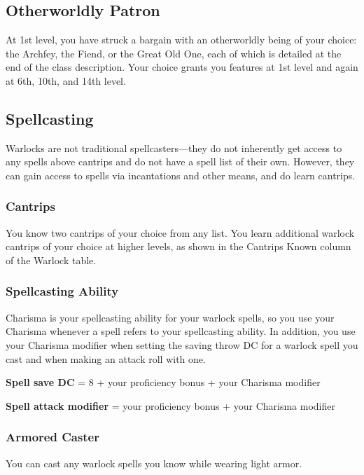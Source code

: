 \subsection{Otherworldly Patron}

At 1st level, you have struck a bargain with an otherworldly being of your choice: the Archfey, the Fiend, or the Great Old One, each of which is detailed at the end of the class description. Your choice grants you features at 1st level and again at 6th, 10th, and 14th level.

\subsection{Spellcasting}
Warlocks are not traditional spellcasters---they do not inherently get access to any spells above cantrips and do not have a spell list of their own. However, they can gain access to spells via incantations and other means, and do learn cantrips.

\subsubsection{Cantrips}

You know two cantrips of your choice from any list. You learn additional warlock cantrips of your choice at higher levels, as shown in the Cantrips Known column of the Warlock table.

\subsubsection{Spellcasting Ability}

Charisma is your spellcasting ability for your warlock spells, so you use your Charisma whenever a spell refers to your spellcasting ability. In addition, you use your Charisma modifier when setting the saving throw DC for a warlock spell you cast and when making an attack roll with one.

\textbf{Spell save DC} = 8 + your proficiency bonus + your Charisma modifier

\textbf{Spell attack modifier} = your proficiency bonus + your Charisma modifier

\subsubsection{Armored Caster}

You can cast any warlock spells you know while wearing light armor.

